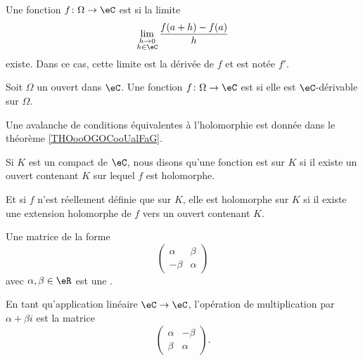 \begin{definition}      \label{DEFooVJVXooKlnFkh}
	Une fonction \( f\colon \Omega\to \eC\) est  si la limite
	\begin{equation}
		\lim_{\substack{h\to0\\h\in \eC}} \frac{ f(a+h)-f(a) }{ h }
	\end{equation}
	existe. Dans ce cas, cette limite est la dérivée de \( f\) et est notée \( f'\).
\end{definition}

\begin{definition}  \label{DefMMpjJZ}
	Soit \( \Omega\) un ouvert dans \( \eC\). Une fonction \( f\colon \Omega\to \eC\) est  si elle est \( \eC\)-dérivable sur \( \Omega\).
\end{definition}

Une avalanche de conditions équivalentes à l'holomorphie est donnée dans le théorème \ref{THOooOGOCooUalFaG}.

\begin{definition}      \label{DEFooQSMCooOoWVZk}
	Si \( K\) est un compact de \( \eC\), nous disons qu'une fonction est  sur \( K\) si il existe un ouvert contenant \( K\) sur lequel \( f\) est holomorphe.

	Et si \( f\) n'est réellement définie que sur \( K\), elle est holomorphe sur \( K\) si il existe une extension holomorphe de \( f\) vers un ouvert contenant \( K\).
\end{definition}

\begin{definition}
	Une matrice de la forme
	\begin{equation}
		\begin{pmatrix}
			\alpha & \beta  \\
			-\beta & \alpha
		\end{pmatrix}
	\end{equation}
	avec \( \alpha,\beta\in \eR\) est une .
\end{definition}

\begin{lemma}       \label{LEMooJNFEooZCbJMo}
	En tant qu'application linéaire \( \eC\to \eC\), l'opération de multiplication par \( \alpha+\beta i\) est la matrice
	\begin{equation}
		\begin{pmatrix}
			\alpha & -\beta \\
			\beta  & \alpha
		\end{pmatrix}.
	\end{equation}
\end{lemma}

